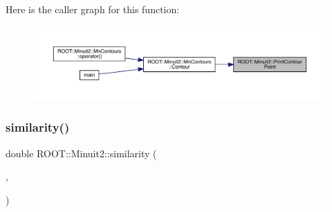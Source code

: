 Here is the caller graph for this function\+:\nopagebreak
\begin{figure}[H]
\begin{center}
\leavevmode
\includegraphics[width=350pt]{d6/d3a/namespaceROOT_1_1Minuit2_a4075583a4cbc4a719ed2ec32e1d76bbf_icgraph}
\end{center}
\end{figure}
\mbox{\label{namespaceROOT_1_1Minuit2_aa54e0f1ba5ca00da1b32710322034fee}} 
\subsubsection{\texorpdfstring{similarity()}{similarity()}}
{\footnotesize\ttfamily double R\+O\+O\+T\+::\+Minuit2\+::similarity (\begin{DoxyParamCaption}\item[{const \mbox{\hyperlink{classROOT_1_1Minuit2_1_1LAVector}{L\+A\+Vector}} \&}]{,  }\item[{const \mbox{\hyperlink{classROOT_1_1Minuit2_1_1LASymMatrix}{L\+A\+Sym\+Matrix}} \&}]{ }\end{DoxyParamCaption})}

